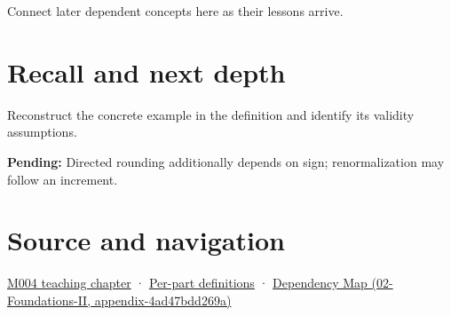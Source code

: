 Connect later dependent concepts here as their lessons arrive.

\section{Recall and next depth}\label{appendix-b572b631069b-recall-and-next-depth}

Reconstruct the concrete example in the definition and identify its validity assumptions.

\textbf{Pending:} Directed rounding additionally depends on sign; renormalization may follow an increment.

\section{Source and navigation}\label{appendix-b572b631069b-source-and-navigation}

\href{Continuous\%20Notes/Computing\%20Foundations\%20-\%20From\%20Bits\%20to\%20C++\%20and\%20Systems\%20APIs\#A\%20stretching\%20ruler\%20for\%20real-valued\%20quantities}{M004 teaching chapter} · \hyperref[appendix-fd090d982a15-m004---parts-61-76]{Per-part definitions} · \href{../02-Foundations-II/main.pdf\#nameddest=appendix-4ad47bdd269a}{Dependency Map (02-Foundations-II, appendix-4ad47bdd269a)}
